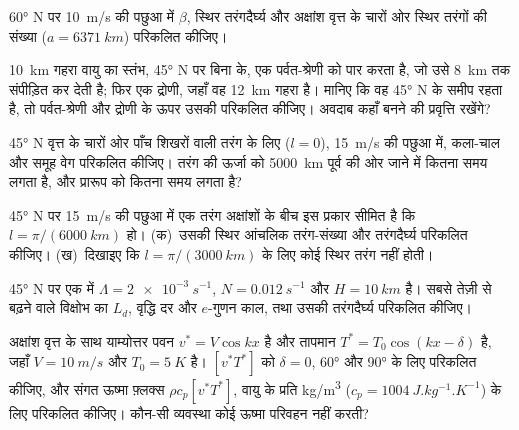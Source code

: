 \begin{exercise}[$\star$]\label{exo:b3:atmospheric-dynamics:4}
\ang{60} N पर \qty{10}{m/s} की पछुआ में $\beta$, स्थिर
तरंगदैर्घ्य और अक्षांश वृत्त के चारों ओर स्थिर तरंगों की संख्या
($a = \qty{6371}{km}$) परिकलित कीजिए।
\end{exercise}

\begin{exercise}[$\star\star$]\label{exo:b3:atmospheric-dynamics:5}
\qty{10}{km} गहरा वायु का स्तंभ, \ang{45} N पर बिना  के,
एक पर्वत-श्रेणी को पार करता है, जो उसे \qty{8}{km} तक संपीड़ित कर देती है; फिर
एक द्रोणी, जहाँ वह \qty{12}{km} गहरा है। मानिए कि वह \ang{45} N के समीप रहता है, तो
पर्वत-श्रेणी और द्रोणी के ऊपर उसकी  परिकलित कीजिए। अवदाब
कहाँ बनने की प्रवृत्ति रखेंगे?
\end{exercise}

\begin{exercise}[$\star\star$]\label{exo:b3:atmospheric-dynamics:6}
\ang{45} N वृत्त के चारों ओर पाँच शिखरों वाली तरंग के लिए ($l = 0$),
\qty{15}{m/s} की पछुआ में, कला-चाल और समूह वेग परिकलित कीजिए।
तरंग की ऊर्जा को \qty{5000}{km} पूर्व की ओर जाने में कितना समय लगता है, और
प्रारूप को कितना समय लगता है?
\end{exercise}

\begin{exercise}[$\star\star$]\label{exo:b3:atmospheric-dynamics:7}
\ang{45} N पर \qty{15}{m/s} की पछुआ में एक तरंग अक्षांशों के बीच इस प्रकार सीमित है
कि $l = \pi/(\qty{6000}{km})$ हो। (क)~उसकी स्थिर आंचलिक तरंग-संख्या और तरंगदैर्घ्य परिकलित कीजिए।
(ख)~दिखाइए कि
$l = \pi/(\qty{3000}{km})$ के लिए कोई स्थिर तरंग नहीं होती।
\end{exercise}

\begin{exercise}[$\star\star$]\label{exo:b3:atmospheric-dynamics:8}
\ang{45} N पर एक  में $\Lambda = \qty{2e-3}{s^{-1}}$, $N =
\qty{0.012}{s^{-1}}$ और $H = \qty{10}{km}$ है। सबसे तेज़ी से बढ़ने वाले विक्षोभ का $L_d$,
वृद्धि दर और $e$-गुणन काल, तथा
उसकी तरंगदैर्घ्य परिकलित कीजिए।
\end{exercise}

\begin{exercise}[$\star\star$]\label{exo:b3:atmospheric-dynamics:9}
अक्षांश वृत्त के साथ  याम्योत्तर पवन $v^* = V\cos kx$ है और
 तापमान $T^* = T_0\cos(kx - \delta)$ है, जहाँ
$V = \qty{10}{m/s}$ और $T_0 = \qty{5}{K}$ है। $[v^*T^*]$ को $\delta = 0$, \ang{60} और
\ang{90} के लिए परिकलित कीजिए, और संगत ऊष्मा फ़्लक्स $\rho c_p[v^*T^*]$, वायु के
प्रति \unit{kg/m^3} ($c_p = \qty{1004}{J.kg^{-1}.K^{-1}}$) के लिए परिकलित कीजिए। कौन-सी
व्यवस्था कोई ऊष्मा परिवहन नहीं करती?
\end{exercise}


